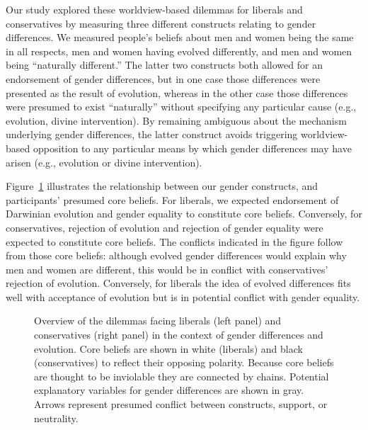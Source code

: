\documentclass[fignum,man]{apa}\usepackage[]{graphicx}\usepackage[]{color}
\begin{document}
Our study explored these worldview-based dilemmas for
liberals and conservatives by measuring 
three different constructs relating to gender differences.
We measured
people's beliefs about men and women being the same in all
respects, men and women having evolved differently,
and men and women being ``naturally different.'' 
The latter two constructs both allowed for an endorsement
of gender differences, 
but in one case those differences were presented as the result of evolution, 
whereas in the other case those differences were presumed to exist ``naturally'' 
without specifying any particular cause (e.g., evolution, divine intervention).
By remaining ambiguous about the mechanism underlying
gender differences, the latter construct 
avoids triggering worldview-based opposition to any
particular means by which gender differences may have arisen 
(e.g., evolution or divine intervention).

Figure~\ref{fig:dilemmas} illustrates the relationship
between our gender constructs, and participants' presumed
core beliefs. For liberals, we expected endorsement of
Darwinian evolution and gender equality to constitute core beliefs. Conversely,
for conservatives, rejection of evolution and rejection of 
gender equality were expected to constitute core beliefs.
The conflicts indicated in the figure follow from those core
beliefs: although evolved gender differences would explain
why men and women are different, this would be in conflict with
conservatives' rejection of evolution. Conversely,
for liberals the idea of evolved differences fits
well with acceptance of evolution but is in potential conflict with 
gender equality.
\begin{figure}[tp] %
	\caption{Overview of the dilemmas facing liberals (left panel) and conservatives
	(right panel) in the context of gender differences and evolution. Core beliefs
    are shown in white (liberals) and black (conservatives) to reflect their
	opposing polarity. Because core beliefs are thought to be inviolable
	they are connected by chains. Potential explanatory variables for gender
	differences are shown in gray. Arrows represent presumed conflict between constructs,
	support, or neutrality. }
	\label{fig:dilemmas}
\end{figure}
\end{document}
